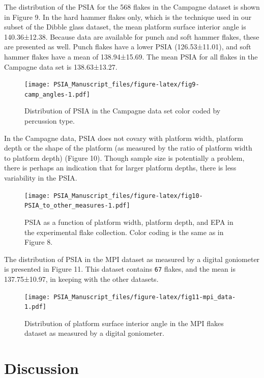 \documentclass[10pt,letterpaper]{article}
\begin{document}
The distribution of the PSIA for the 568 flakes in the Campagne dataset
is shown in Figure 9. In the hard hammer flakes only, which is the
technique used in our subset of the Dibble glass dataset, the mean
platform surface interior angle is 140.36±12.38. Because data are
available for punch and soft hammer flakes, these are presented as well.
Punch flakes have a lower PSIA (126.53±11.01), and soft hammer flakes
have a mean of 138.94±15.69. The mean PSIA for all flakes in the
Campagne data set is 138.63±13.27.

\begin{figure}
\centering
\texttt{[image: PSIA\_Manuscript\_files/figure-latex/fig9-camp\_angles-1.pdf]}
\caption{Distribution of PSIA in the Campagne data set color coded by
percussion type.}
\end{figure}

In the Campagne data, PSIA does not covary with platform width, platform
depth or the shape of the platform (as measured by the ratio of platform
width to platform depth) (Figure 10). Though sample size is potentially
a problem, there is perhaps an indication that for larger platform
depths, there is less variability in the PSIA.

\begin{figure}
\centering
\texttt{[image: PSIA\_Manuscript\_files/figure-latex/fig10-PSIA\_to\_other\_measures-1.pdf]}
\caption{PSIA as a function of platform width, platform depth, and EPA
in the experimental flake collection. Color coding is the same as in
Figure 8.}
\end{figure}

The distribution of PSIA in the MPI dataset as measured by a digital
goniometer is presented in Figure 11. This dataset contains \texttt{67}
flakes, and the mean is 137.75±10.97, in keeping with the other
datasets.

\begin{figure}
\centering
\texttt{[image: PSIA\_Manuscript\_files/figure-latex/fig11-mpi\_data-1.pdf]}
\caption{Distribution of platform surface interior angle in the MPI
flakes dataset as measured by a digital goniometer.}
\end{figure}

\hypertarget{discussion}{%
\section{Discussion}\label{discussion}}
\end{document}
